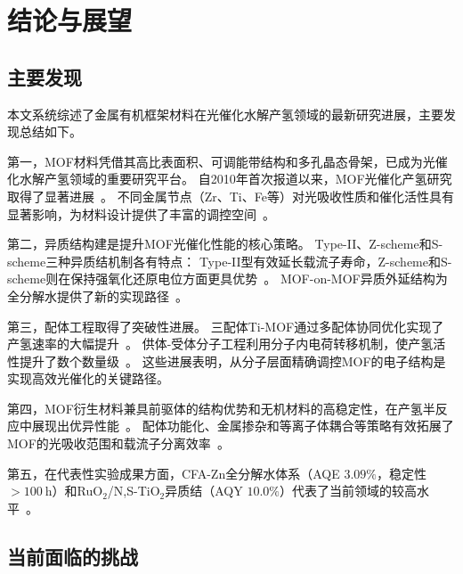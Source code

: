 \section{结论与展望}\label{sec:conclusion}


\subsection{主要发现}

本文系统综述了金属有机框架材料在光催化水解产氢领域的最新研究进展，主要发现总结如下。

第一，MOF材料凭借其高比表面积、可调能带结构和多孔晶态骨架，已成为光催化水解产氢领域的重要研究平台。
自2010年首次报道以来，MOF光催化产氢研究取得了显著进展~\citep{chen2023mof_owsp_review}。 %
不同金属节点（Zr、Ti、Fe等）对光吸收性质和催化活性具有显著影响，为材料设计提供了丰富的调控空间~\citep{reddy2021mof_h2_advances}。 %

第二，异质结构建是提升MOF光催化性能的核心策略。
Type-II、Z-scheme和S-scheme三种异质结机制各有特点：
Type-II型有效延长载流子寿命，Z-scheme和S-scheme则在保持强氧化还原电位方面更具优势~\citep{zhang2025optimization_strategies}。 %
MOF-on-MOF异质外延结构为全分解水提供了新的实现路径~\citep{uio66_mil88b_2024}。 %

第三，配体工程取得了突破性进展。
三配体Ti-MOF通过多配体协同优化实现了产氢速率的大幅提升~\citep{liu2024three_ligand_timof}。 %
供体-受体分子工程利用分子内电荷转移机制，使产氢活性提升了数个数量级~\citep{yan2023donor_acceptor_mof}。 %
这些进展表明，从分子层面精确调控MOF的电子结构是实现高效光催化的关键路径。

第四，MOF衍生材料兼具前驱体的结构优势和无机材料的高稳定性，在产氢半反应中展现出优异性能~\citep{singh2025mini_review}。 %
配体功能化、金属掺杂和等离子体耦合等策略有效拓展了MOF的光吸收范围和载流子分离效率~\citep{li2024mof_composites_h2}。 %

第五，在代表性实验成果方面，CFA-Zn全分解水体系（AQE $3.09\%$，稳定性$>100~\mathrm{h}$）和RuO$_2$/N,S-TiO$_2$异质结（AQY $10.0\%$）代表了当前领域的较高水平~\citep{cfazn2025ows,rtta2024heterojunction}。 %


\subsection{当前面临的挑战}

